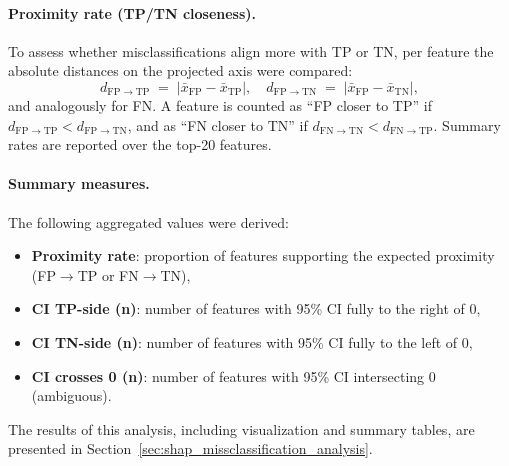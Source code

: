 \paragraph{Proximity rate (TP/TN closeness).}
To assess whether misclassifications align more with TP or TN, per feature the absolute distances on the projected axis were compared:
\[
d_{\mathrm{FP}\to\mathrm{TP}} \;=\; \bigl|\bar{x}_{\mathrm{FP}} - \bar{x}_{\mathrm{TP}}\bigr|,\quad
d_{\mathrm{FP}\to\mathrm{TN}} \;=\; \bigl|\bar{x}_{\mathrm{FP}} - \bar{x}_{\mathrm{TN}}\bigr|,
\]
and analogously for FN. A feature is counted as “FP closer to TP” if $d_{\mathrm{FP}\to\mathrm{TP}} < d_{\mathrm{FP}\to\mathrm{TN}}$, and as “FN closer to TN” if $d_{\mathrm{FN}\to\mathrm{TN}} < d_{\mathrm{FN}\to\mathrm{TP}}$. Summary rates are reported over the top-20 features. 

\paragraph{Summary measures.}
The following aggregated values were derived:
\begin{itemize}
  \item \textbf{Proximity rate}: proportion of features supporting the expected proximity (FP\(\rightarrow\)TP or FN\(\rightarrow\)TN),
  \item \textbf{CI TP-side (n)}: number of features with 95\% CI fully to the right of 0,
  \item \textbf{CI TN-side (n)}: number of features with 95\% CI fully to the left of 0,
  \item \textbf{CI crosses 0 (n)}: number of features with 95\% CI intersecting 0 (ambiguous).
\end{itemize}

The results of this analysis, including visualization and summary tables, are presented in Section~\ref{sec:shap_missclassification_analysis}.



